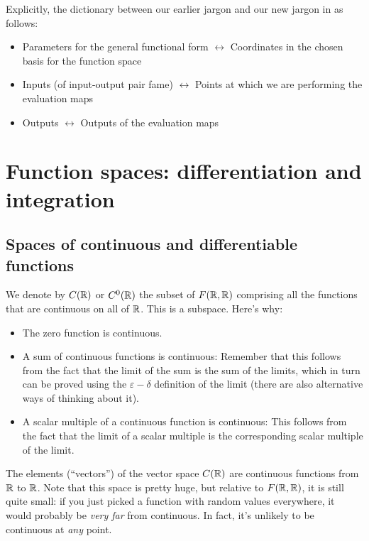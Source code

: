 \documentclass[10pt]{amsart}
\begin{document}
Explicitly, the dictionary between our earlier jargon and our new
jargon in as follows:

\begin{itemize}
\item Parameters for the general functional form $\leftrightarrow$
  Coordinates in the chosen basis for the function space
\item Inputs (of input-output pair fame) $\leftrightarrow$ Points at
  which we are performing the evaluation maps
\item Outputs $\leftrightarrow$ Outputs of the evaluation maps
\end{itemize}

\section{Function spaces: differentiation and integration}

\subsection{Spaces of continuous and differentiable functions}

We denote by $C(\mathbb{R})$ or $C^0(\mathbb{R})$ the subset of $F(\mathbb{R},\mathbb{R})$ comprising
all the functions that are continuous on all of $\mathbb{R}$. This is a
subspace. Here's why:

\begin{itemize}
\item The zero function is continuous.
\item A sum of continuous functions is continuous: Remember that this
  follows from the fact that the limit of the sum is the sum of the
  limits, which in turn can be proved using the $\varepsilon-\delta$
  definition of the limit (there are also alternative ways of thinking
  about it).
\item A scalar multiple of a continuous function is continuous: This
  follows from the fact that the limit of a scalar multiple is the
  corresponding scalar multiple of the limit.
\end{itemize}

The elements (``vectors'') of the vector space $C(\mathbb{R})$ are continuous
functions from $\mathbb{R}$ to $\mathbb{R}$. Note that this space is pretty huge, but
relative to $F(\mathbb{R},\mathbb{R})$, it is still quite small: if you just picked a
function with random values everywhere, it would probably be {\em very
  far} from continuous. In fact, it's unlikely to be continuous at
{\em any} point.
\end{document}
